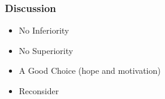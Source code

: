 \begin{frame}
    \frametitle{Discussion}
    \LARGE
    \begin{itemize}[<+->]
        \item No Inferiority
        \item No Superiority
        \item A Good Choice (hope and motivation) 
        \item Reconsider
    \end{itemize}
\end{frame}